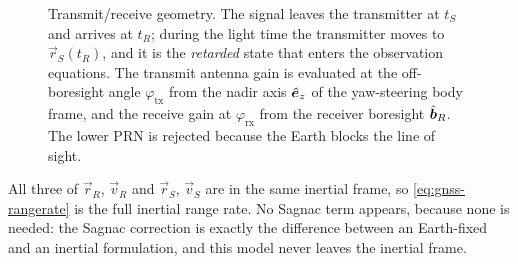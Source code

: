 \begin{figure}[htbp]
  \caption{Transmit/receive geometry. The signal leaves the transmitter at
    $t_S$ and arrives at $t_R$; during the light time the transmitter moves to
    $\vec{r}_S(t_R)$, and it is the \emph{retarded} state that enters the
    observation equations. The transmit antenna gain is evaluated at the
    off-boresight angle $\varphi_{\mathrm{tx}}$ from the nadir axis
    $\hat{\bm{e}}_z$ of the yaw-steering body frame, and the receive gain at
    $\varphi_{\mathrm{rx}}$ from the receiver boresight $\hat{\bm{b}}_R$. The
    lower PRN is rejected because the Earth blocks the line of sight.}
  \label{fig:gnss-geometry}
\end{figure}

\begin{lupntnote}
  All three of $\vec{r}_R$, $\vec{v}_R$ and $\vec{r}_S$, $\vec{v}_S$ are in
  the same inertial frame, so \cref{eq:gnss-rangerate} is the full inertial
  range rate. No Sagnac term appears, because none is needed: the Sagnac
  correction is exactly the difference between an Earth-fixed and an inertial
  formulation, and this model never leaves the inertial frame.
\end{lupntnote}

